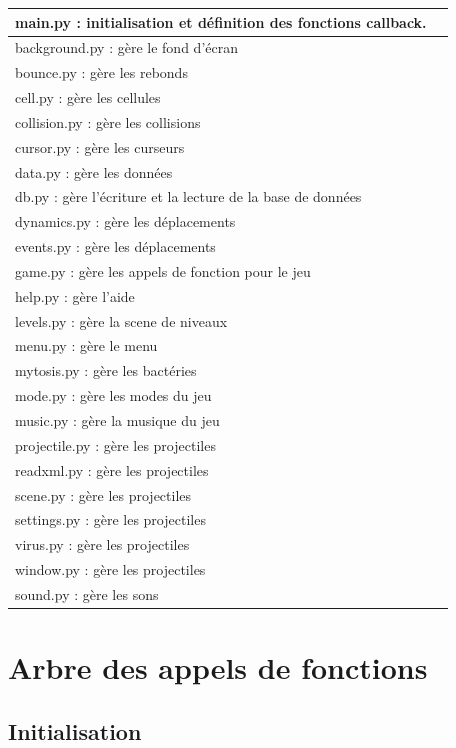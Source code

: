 \documentclass{article}
\begin{document}
\begin{tabular}{||l|l||}
 \hline main.py : initialisation et définition des fonctions callback. \\
 \hline background.py : gère le fond d'écran \\
 \hline bounce.py : gère les rebonds  \\
 \hline cell.py : gère les cellules \\
 \hline collision.py : gère les collisions \\
 \hline cursor.py : gère les curseurs \\
 \hline data.py : gère les données \\
 \hline db.py : gère l'écriture et la lecture de la base de données \\
 \hline dynamics.py : gère les déplacements \\
 \hline events.py : gère les déplacements\\
 \hline game.py : gère les appels de fonction pour le jeu \\
 \hline help.py : gère l'aide \\
 \hline levels.py : gère la scene de niveaux \\
 \hline menu.py : gère le menu \\
 \hline mytosis.py : gère les bactéries \\
 \hline mode.py : gère les modes du jeu \\
 \hline music.py : gère la musique du jeu \\
 \hline projectile.py : gère les projectiles \\
 \hline readxml.py : gère les projectiles \\
 \hline scene.py : gère les projectiles \\
 \hline settings.py : gère les projectiles \\
 \hline virus.py : gère les projectiles \\
 \hline window.py : gère les projectiles \\
 \hline sound.py : gère les sons \\
 \hline
\end{tabular}
\newpage

\section{Arbre des appels de fonctions}

\subsection{Initialisation}
\end{document}
